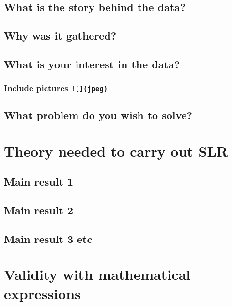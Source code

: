 \documentclass[]{article}
\begin{document}
\subsection{What is the story behind the
data?}\label{what-is-the-story-behind-the-data}

\subsection{Why was it gathered?}\label{why-was-it-gathered}

\subsection{What is your interest in the
data?}\label{what-is-your-interest-in-the-data}

\subsubsection{\texorpdfstring{Include pictures
\texttt{!{[}{]}(jpeg)}}{Include pictures !{[}{]}(jpeg)}}\label{include-pictures-jpeg}

\subsection{What problem do you wish to
solve?}\label{what-problem-do-you-wish-to-solve}

\section{Theory needed to carry out
SLR}\label{theory-needed-to-carry-out-slr}

\subsection{Main result 1}\label{main-result-1}

\subsection{Main result 2}\label{main-result-2}

\subsection{Main result 3 etc}\label{main-result-3-etc}

\section{Validity with mathematical
expressions}\label{validity-with-mathematical-expressions}
\end{document}
